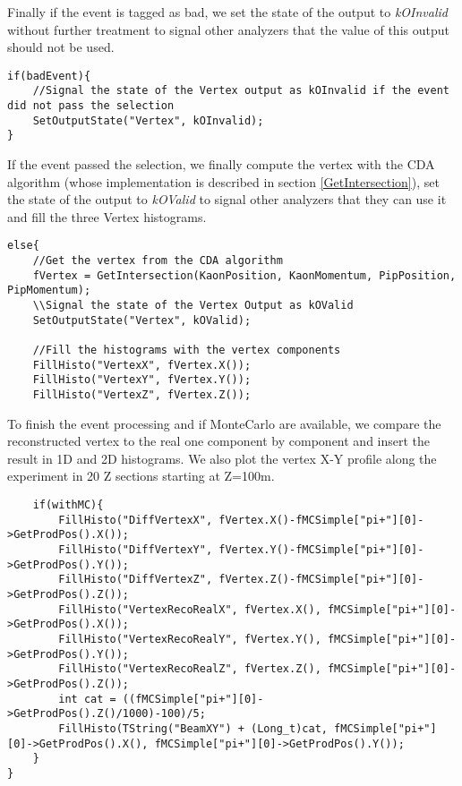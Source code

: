 \documentclass{article}
\newcommand{\var}[1]{\textit{#1}}
\begin{document}
Finally if the event is tagged as bad, we set the state of the output to \var{kOInvalid} without
further treatment to signal other analyzers that the value of this output should not be used. 

\begin{lstlisting}
if(badEvent){
	//Signal the state of the Vertex output as kOInvalid if the event did not pass the selection
	SetOutputState("Vertex", kOInvalid);
}
\end{lstlisting}

If the event passed the selection, we finally compute the vertex with the CDA algorithm (whose
implementation is described in section \ref{GetIntersection}), set the state of the output to
\var{kOValid} to signal other analyzers that they can use it and fill the three Vertex histograms.

\begin{lstlisting}
else{
	//Get the vertex from the CDA algorithm
	fVertex = GetIntersection(KaonPosition, KaonMomentum, PipPosition, PipMomentum);
	\\Signal the state of the Vertex Output as kOValid
	SetOutputState("Vertex", kOValid);
	
	//Fill the histograms with the vertex components
	FillHisto("VertexX", fVertex.X());
	FillHisto("VertexY", fVertex.Y());
	FillHisto("VertexZ", fVertex.Z());
\end{lstlisting}

To finish the event processing and if MonteCarlo are available, we compare the reconstructed vertex
to the real one component by component and insert the result in 1D and 2D histograms. We also plot
the vertex X-Y profile along the experiment in 20 Z sections starting at Z=100m. 
\begin{lstlisting}
	if(withMC){
		FillHisto("DiffVertexX", fVertex.X()-fMCSimple["pi+"][0]->GetProdPos().X());
		FillHisto("DiffVertexY", fVertex.Y()-fMCSimple["pi+"][0]->GetProdPos().Y());
		FillHisto("DiffVertexZ", fVertex.Z()-fMCSimple["pi+"][0]->GetProdPos().Z());
		FillHisto("VertexRecoRealX", fVertex.X(), fMCSimple["pi+"][0]->GetProdPos().X());
		FillHisto("VertexRecoRealY", fVertex.Y(), fMCSimple["pi+"][0]->GetProdPos().Y());
		FillHisto("VertexRecoRealZ", fVertex.Z(), fMCSimple["pi+"][0]->GetProdPos().Z());
		int cat = ((fMCSimple["pi+"][0]->GetProdPos().Z()/1000)-100)/5;
		FillHisto(TString("BeamXY") + (Long_t)cat, fMCSimple["pi+"][0]->GetProdPos().X(), fMCSimple["pi+"][0]->GetProdPos().Y());
	}
}
\end{lstlisting}
\end{document}
